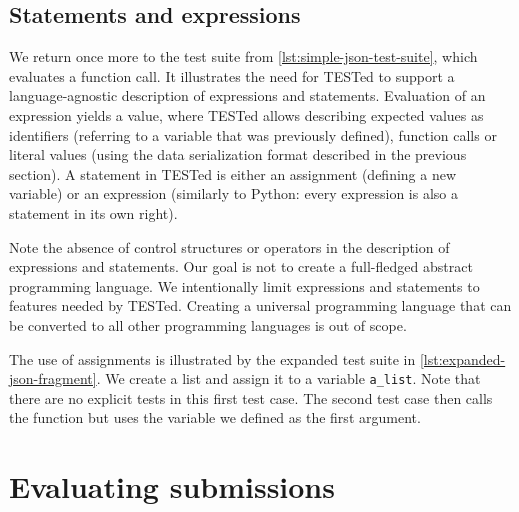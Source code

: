 \documentclass[../main]{subfiles}
\begin{document}

\subsection{Statements and expressions}\label{subsec:tested1-statements-and-expressions}

We return once more to the test suite from \cref{lst:simple-json-test-suite}, which evaluates a function call.
It illustrates the need for TESTed to support a language-agnostic description of expressions and statements.
Evaluation of an expression yields a value, where TESTed allows describing expected values as identifiers (referring to a variable that was previously defined), function calls or literal values (using the data serialization format described in the previous section).
A statement in TESTed is either an assignment (defining a new variable) or an expression (similarly to Python: every expression is also a statement in its own right).

Note the absence of control structures or operators in the description of expressions and statements.
Our goal is not to create a full-fledged abstract programming language.
We intentionally limit expressions and statements to features needed by TESTed.
Creating a universal programming language that can be converted to all other programming languages is out of scope.

The use of assignments is illustrated by the expanded test suite in \cref{lst:expanded-json-fragment}.
We create a list and assign it to a variable \texttt{a\_list}.
Note that there are no explicit tests in this first test case.
The second test case then calls the function but uses the variable we defined as the first argument.

\section{Evaluating submissions}\label{sec:tested1-evaluating-submissions}
\end{document}
